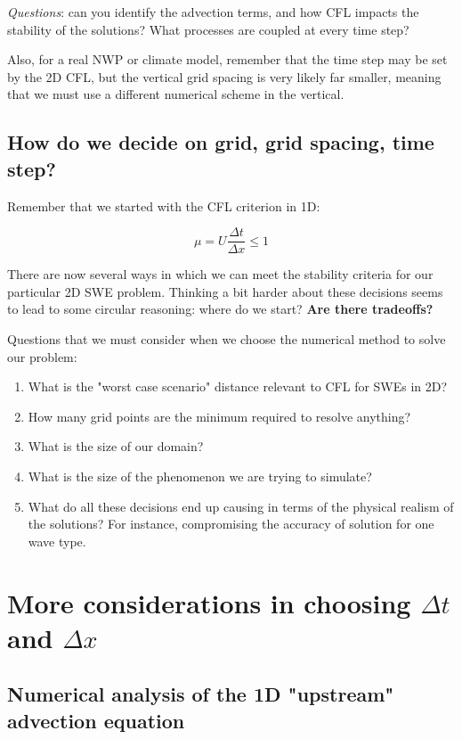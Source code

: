\emph{Questions}: can you identify the advection terms, and how CFL impacts the stability of the solutions? What processes are coupled at every time step?

Also, for a real NWP or climate model, remember that the time step may be set by the 2D CFL, but the vertical grid spacing is very likely far smaller, meaning that we must use a different numerical scheme in the vertical.

\subsection{How do we decide on grid, grid spacing, time step?}

Remember that we started with the CFL criterion in 1D:

\begin{equation}
	\mu = U \frac {\Delta t}{\Delta x} \le 1
\end{equation}

There are now several ways in which we can meet the stability criteria for our particular 2D SWE problem. Thinking a bit harder about these decisions seems to lead to some circular reasoning: where do we start? \textbf{Are there tradeoffs?} 
\medskip

Questions that we must consider when we choose the numerical method to solve our problem:
\begin{enumerate}
	\item What is the "worst case scenario" distance relevant to CFL for SWEs in 2D?
	\item How many grid points are the minimum required to resolve anything?
	\item What is the size of our domain?
	\item What is the size of the phenomenon we are trying to simulate?
	\item What do all these decisions end up causing in terms of the physical realism of the solutions? For instance, compromising the accuracy of solution for one wave type.
	
\end{enumerate}

\section{More considerations in choosing $\Delta t$ and $\Delta x $}
\subsection{Numerical analysis of the 1D "upstream" advection equation}

